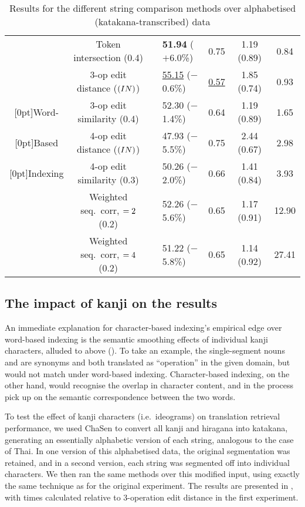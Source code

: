 \begin{table*}[htbp]
\begin{center}
\begin{tabular}{|c|c|cl|c|c|c|}
      & Token intersection (0.4) & & {\bf 51.94} ($+$6.0\%) & 0.75 & 1.19 (0.89) & 0.84 \\
      \cline{2-7}
      & 3-op edit distance ($(IN)$) & & \ul{55.15} ($-$0.6\%) & \ul{0.57} & 1.85 (0.74) & 0.93 \\
      \raisebox{1.5ex}[0pt]{\sc Word-} & 3-op edit similarity (0.4) & & 52.30 ($-$1.4\%) & 0.64 & 1.19 (0.89) & 1.65 \\
      \raisebox{1.5ex}[0pt]{\sc Based} & 4-op edit distance ($(IN)$) & & 47.93 ($-$5.5\%) & 0.75 & 2.44 (0.67) & 2.98 \\
      \raisebox{1.5ex}[0pt]{\sc Indexing} & 4-op edit similarity (0.3) & & 50.26 ($-$2.0\%) & 0.66 & 1.41 (0.84) & 3.93 \\
      & Weighted seq.\ corr, $=2$ (0.2) & & 52.26 ($-$5.6\%) & 0.65 & 1.17 (0.91) & 12.90 \\
      & Weighted seq.\ corr, $=4$ (0.2) & & 51.22 ($-$5.8\%) & 0.65 & 1.14 (0.92) & 27.41 \\
      \hline
    \end{tabular}
  \end{center}
    \caption{Results for the different string comparison methods over
      alphabetised\\ (katakana-transcribed) data}
    \label{tab:results2}
\end{table*}





\subsection{The impact of kanji on the results}
\label{sec:kanji}

An immediate explanation for character-based indexing's empirical edge
over word-based indexing is the semantic smoothing effects of individual
kanji characters, alluded to above (). To take an
example, the single-segment nouns  and
 are synonyms and both translated as
``operation'' in the given domain, but would not match under word-based
indexing.  Character-based indexing, on the other hand, would recognise
the overlap in character content, and in the process pick up on the
semantic correspondence between the two words.

To test the effect of kanji characters (i.e.\ ideograms) on translation
retrieval performance, we used ChaSen to convert all kanji and hiragana
into katakana, generating an essentially alphabetic version of each
string, analogous to the case of Thai. In one version of this
alphabetised data, the original segmentation was retained, and in a
second version, each string was segmented off into individual
characters. We then ran the same methods over this modified input, using
exactly the same technique as for the original experiment. The results
are presented in , with times calculated relative
to 3-operation edit distance in the first experiment.

